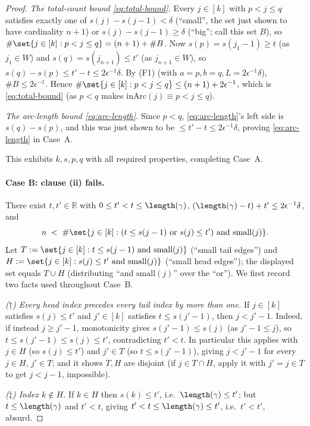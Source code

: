 \begin{proof}
  \emph{The total-count bound \eqref{eq:total-bound}.} Every $j\in[k]$ with $p<j\le q$ satisfies
  exactly one of $s(j)-s(j-1)<\delta$ (``small'', the set just shown to have cardinality $n+1$) or
  $s(j)-s(j-1)\ge\delta$ (``big''; call this set $B$), so
  $\#\set{j\in[k]:p<j\le q} = (n+1) + \#B$. Now $s(p)=s(j_1-1)\ge t$ (as $j_1\in W$) and
  $s(q)=s(j_{n+1})\le t'$ (as $j_{n+1}\in W$), so $s(q)-s(p)\le t'-t\le2\epsilon^{-1}\delta$. By
  (F1) (with $a=p,b=q,L=2\epsilon^{-1}\delta$), $\#B\le 2\epsilon^{-1}$. Hence
  $\#\set{j\in[k]:p<j\le q}\le(n+1)+2\epsilon^{-1}$, which is \eqref{eq:total-bound} (as $p<q$
  makes $\mathrm{inArc}(j)\equiv p<j\le q$).

  \emph{The arc-length bound \eqref{eq:arc-length}.} Since $p<q$, \eqref{eq:arc-length}'s left side
  is $s(q)-s(p)$, and this was just shown to be $\le t'-t\le2\epsilon^{-1}\delta$, proving
  \eqref{eq:arc-length} in Case~A.

  This exhibits $k,s,p,q$ with all required properties, completing Case~A.

  \paragraph{Case B: clause (ii) fails.} There exist $t,t'\in\mathbb{R}$ with $0\le t'<t\le
  \length(\gamma)$, $(\length(\gamma)-t)+t'\le2\epsilon^{-1}\delta$, and
  \[
    n \;<\; \#\set{j\in[k] : (t\le s(j-1) \text{ or } s(j)\le t') \text{ and } \mathrm{small}(j)}
    .
  \]
  Let $T:=\set{j\in[k] : t\le s(j-1) \text{ and } \mathrm{small}(j)}$ (``small tail edges'') and
  $H:=\set{j\in[k] : s(j)\le t' \text{ and } \mathrm{small}(j)}$ (``small head edges''); the
  displayed set equals $T\cup H$ (distributing ``and $\mathrm{small}(j)$'' over the ``or''). We
  first record two facts used throughout Case~B.

  \emph{($\dagger$) Every head index precedes every tail index by more than one.} If $j\in[k]$
  satisfies $s(j)\le t'$ and $j'\in[k]$ satisfies $t\le s(j'-1)$, then $j<j'-1$. Indeed, if instead
  $j\ge j'-1$, monotonicity gives $s(j'-1)\le s(j)$ (as $j'-1\le j$), so $t\le s(j'-1)\le s(j)\le
  t'$, contradicting $t'<t$. In particular this applies with $j\in H$ (so $s(j)\le t'$) and
  $j'\in T$ (so $t\le s(j'-1)$), giving $j<j'-1$ for every $j\in H$, $j'\in T$; and it shows $T,H$
  are disjoint (if $j\in T\cap H$, apply it with $j'=j\in T$ to get $j<j-1$, impossible).

  \emph{($\ddagger$) Index $k\notin H$.} If $k\in H$ then $s(k)\le t'$, i.e.\ $\length(\gamma)\le
  t'$; but $t\le\length(\gamma)$ and $t'<t$, giving $t'<t\le\length(\gamma)\le t'$, i.e.\ $t'<t'$,
  absurd.


\end{proof}
